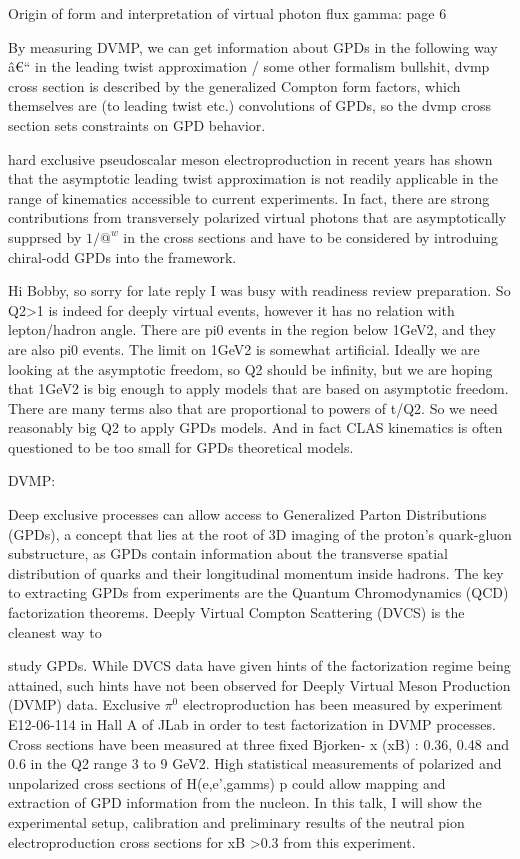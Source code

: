 Origin of form and interpretation of virtual photon flux gamma: \cite{Amaldi1979Pion-electroproduction} page 6


By measuring DVMP, we can get information about GPDs in the following way â€“ in the leading twist approximation / some other formalism bullshit, dvmp cross section is described by the generalized Compton form factors, which themselves are (to leading twist etc.) convolutions of GPDs, so the dvmp cross section sets constraints on GPD behavior.

  hard exclusive pseudoscalar meson electroproduction in recent years has shown that the asymptotic leading twist approximation is not readily applicable in the range of kinematics accessible to current experiments. In fact, there are strong contributions from transversely polarized virtual photons that are asymptotically supprsed by $1/@^w$ in the cross sections and have to be considered by introduing chiral-odd GPDs into the framework.   



Hi Bobby, so sorry for late reply I was busy with readiness review preparation.
So Q2>1 is indeed for deeply virtual events, however it has no relation with lepton/hadron angle. There are pi0 events in the region below 1GeV2, and they are also pi0 events. The limit on 1GeV2 is somewhat artificial. Ideally we are looking at the asymptotic freedom, so Q2 should be infinity, but we are hoping that 1GeV2 is big enough to apply models that are based on asymptotic freedom. There are many terms also that are proportional to powers of t/Q2. So we need reasonably big Q2 to apply GPDs models. And in fact CLAS kinematics is often questioned to be too small for GPDs theoretical models.


    DVMP:

    Deep exclusive processes can allow access to Generalized Parton Distributions (GPDs), a concept that lies at the root of 3D imaging of the proton's quark-gluon substructure, as GPDs contain information about the transverse spatial distribution of quarks and their longitudinal momentum inside hadrons. The key to extracting GPDs from experiments are the Quantum Chromodynamics (QCD) factorization theorems. Deeply Virtual Compton Scattering (DVCS) is the cleanest way to
    
    study GPDs. While DVCS data have given hints of the factorization regime being attained, such hints have not been observed for Deeply Virtual Meson Production (DVMP) data. Exclusive $\pi^0$ electroproduction has been measured by experiment E12-06-114 in Hall A of JLab in order to test factorization in DVMP processes. Cross sections have been measured at three fixed Bjorken- x (xB) : 0.36, 0.48 and 0.6 in the Q2 range 3 to 9 GeV2. High statistical measurements of polarized and unpolarized cross sections of H(e,e',gamms) p could allow mapping and extraction of GPD information from the nucleon. In this talk, I will show the experimental setup, calibration and preliminary results of the neutral pion electroproduction cross sections for xB >0.3 from this experiment.  



